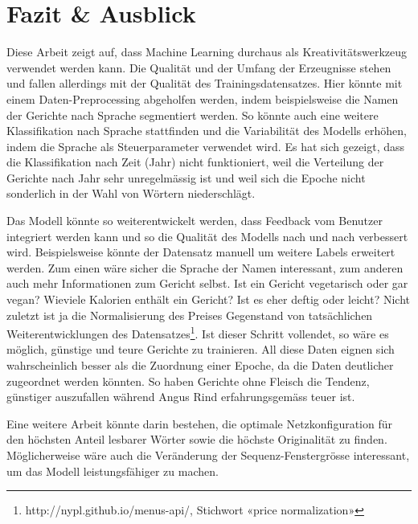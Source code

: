 \chapter{Fazit \& Ausblick}
\label{ch:conclusions}

Diese Arbeit zeigt auf, dass Machine Learning durchaus als Kreativitätswerkzeug verwendet werden kann.
Die Qualität und der Umfang der Erzeugnisse stehen und fallen allerdings mit der Qualität des Trainingsdatensatzes.
Hier könnte mit einem Daten-Preprocessing abgeholfen werden, indem beispielsweise die Namen der Gerichte nach
Sprache segmentiert werden.
So könnte auch eine weitere Klassifikation nach Sprache stattfinden und die Variabilität des Modells erhöhen, indem
die Sprache als Steuerparameter verwendet wird.
Es hat sich gezeigt, dass die Klassifikation nach Zeit (Jahr) nicht funktioniert, weil die Verteilung der Gerichte nach Jahr sehr unregelmässig ist und
weil sich die Epoche nicht sonderlich in der Wahl von Wörtern niederschlägt.

Das Modell könnte so weiterentwickelt werden, dass Feedback vom Benutzer integriert werden kann und so die Qualität des Modells nach und nach verbessert wird.
Beispielsweise könnte der Datensatz manuell um weitere Labels erweitert werden.
Zum einen wäre sicher die Sprache der Namen interessant, zum anderen auch mehr Informationen zum Gericht selbst.
Ist ein Gericht vegetarisch oder gar vegan?
Wieviele Kalorien enthält ein Gericht?
Ist es eher deftig oder leicht?
Nicht zuletzt ist ja die Normalisierung des Preises Gegenstand von tatsächlichen Weiterentwicklungen des Datensatzes\footnote{http://nypl.github.io/menus-api/, Stichwort «price normalization»}.
Ist dieser Schritt vollendet, so wäre es möglich, günstige und teure Gerichte zu trainieren.
All diese Daten eignen sich wahrscheinlich besser als die Zuordnung einer Epoche, da die Daten deutlicher zugeordnet werden könnten.
So haben Gerichte ohne Fleisch die Tendenz, günstiger auszufallen während Angus Rind erfahrungsgemäss teuer ist.

Eine weitere Arbeit könnte darin bestehen, die optimale Netzkonfiguration für den höchsten Anteil lesbarer Wörter sowie die
höchste Originalität zu finden.
Möglicherweise wäre auch die Veränderung der Sequenz-Fenstergrösse interessant, um das Modell leistungsfähiger zu machen.
